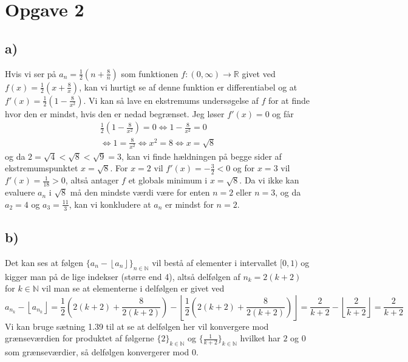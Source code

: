 \documentclass{article}
\newcommand{\m}[1]{\mathbb{#1}}
\newcommand{\mR}{\m{R}}
\newcommand{\mN}{\m{N}}
\newcommand{\floor}[1]{\left\lfloor #1\right\rfloor}
\begin{document}
\section*{Opgave 2}
\subsection*{a)}
Hvis vi ser på $a_n = \frac{1}{2}(n + \frac{8}{n})$ som funktionen $f: (0, \infty) \to \mR$ givet ved $f(x) = \frac{1}{2}(x + \frac{8}{x})$, 
kan vi hurtigt se af denne funktion er differentiabel og at $f'(x) = \frac{1}{2}(1 - \frac{8}{x^2})$. 
Vi kan så lave en ekstremums undersøgelse af $f$ for at finde hvor den er mindst, hvis den er nedad begrænset.
Jeg løser $f'(x) = 0$ og får
\begin{align*}
    \frac{1}{2}(1 - \frac{8}{x^2}) = 0 \iff 1 - \frac{8}{x^2} = 0 \\
    \iff 1 = \frac{8}{x^2} \iff x^2 = 8 \iff x = \sqrt{8}
\end{align*}
og da $2 = \sqrt{4} < \sqrt{8} < \sqrt{9} = 3$, kan vi finde hældningen på begge sider af ekstremumspunktet $x = \sqrt{8}$.
For $x = 2$ vil $f'(x) = -\frac{3}{2} < 0$ og for $x = 3$ vil $f'(x) = \frac{1}{18} > 0$, altså antager $f$ et globals minimum i $x = \sqrt{8}$.
Da vi ikke kan evaluere $a_n$ i $\sqrt{8}$ må den mindste værdi være for enten $n = 2$ eller $n = 3$, og da $a_2 = 4$ og $a_3 = \frac{11}{3}$,
kan vi konkludere at $a_n$ er mindst for $n=2$.


\subsection*{b)}
Det kan ses at følgen $\{a_n - \floor{a_n} \}_{n \in \mN}$ vil bestå af elementer i intervallet $[0, 1)$ og kigger man på de lige indekser (større end 4),
altså delfølgen af $n_k = 2(k+2)$ for $k \in \mN$ vil man se at elementerne i delfølgen er givet ved 
\[
    a_{n_k} - \floor{a_{n_k}} = \frac{1}{2} (2(k+2) + \frac{8}{2(k+2)}) - \floor{\frac{1}{2} (2(k+2) + \frac{8}{2(k+2)})}= \frac{2}{k+2} - \floor{\frac{2}{k+2}} = \frac{2}{k+2} 
\]
Vi kan bruge sætning 1.39 til at se at delfølgen her vil konvergere mod grænseværdien for produktet af følgerne $\{2\}_{k \in \mN}$ og $\{ \frac{1}{k+2} \}_{k \in \mN}$
hvilket har $2$ og $0$ som grænseværdier, så delfølgen konvergerer mod $0$.
\end{document}
